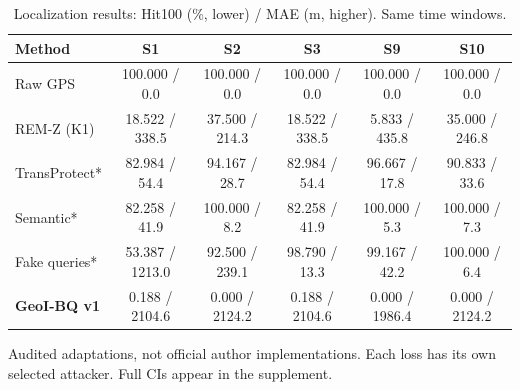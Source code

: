 \begin{table}[t]\centering\footnotesize
\caption{Localization results: Hit100 (\%, lower) / MAE (m, higher). Same time windows.}\label{tab:privacy}
\begin{tabularx}{\linewidth}{@{}P{2.7cm}CCCCC@{}}\toprule
\textbf{Method} & \textbf{S1} & \textbf{S2} & \textbf{S3} & \textbf{S9} & \textbf{S10} \\
\midrule
Raw GPS & 100.000 / 0.0 & 100.000 / 0.0 & 100.000 / 0.0 & 100.000 / 0.0 & 100.000 / 0.0 \\
REM-Z (K1) & 18.522 / 338.5 & 37.500 / 214.3 & 18.522 / 338.5 & 5.833 / 435.8 & 35.000 / 246.8 \\
TransProtect* & 82.984 / 54.4 & 94.167 / 28.7 & 82.984 / 54.4 & 96.667 / 17.8 & 90.833 / 33.6 \\
Semantic* & 82.258 / 41.9 & 100.000 / 8.2 & 82.258 / 41.9 & 100.000 / 5.3 & 100.000 / 7.3 \\
Fake queries* & 53.387 / 1213.0 & 92.500 / 239.1 & 98.790 / 13.3 & 99.167 / 42.2 & 100.000 / 6.4 \\
\textbf{GeoI-BQ v1} & 0.188 / 2104.6 & 0.000 / 2124.2 & 0.188 / 2104.6 & 0.000 / 1986.4 & 0.000 / 2124.2 \\
\bottomrule\end{tabularx}
\par\smallskip\raggedright * Audited adaptations, not official author implementations. Each loss has its own selected attacker. Full CIs appear in the supplement.
\end{table}
